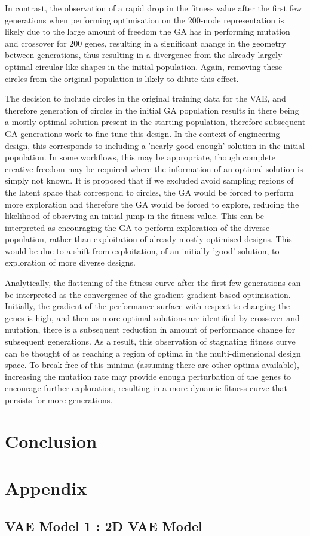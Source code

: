 \documentclass{article}
\begin{document}
In contrast, the observation of a rapid drop in the fitness value after the first few generations when performing optimisation on the 200-node representation is likely due to the large amount of freedom the GA has in performing mutation and crossover for 200 genes, resulting in a significant change in the geometry between generations, thus resulting in a divergence from the already largely optimal circular-like shapes in the initial population. Again, removing these circles from the original population is likely to dilute this effect.

The decision to include circles in the original training data for the VAE, and therefore generation of circles in the initial GA population results in there being a mostly optimal solution present in the starting population, therefore subsequent GA generations work to fine-tune this design. In the context of engineering design, this corresponds to including a 'nearly good enough' solution in the initial population. In some workflows, this may be appropriate, though complete creative freedom may be required where the information of an optimal solution is simply not known. It is proposed that if we excluded avoid sampling regions of the latent space that correspond to circles, the GA would be forced to perform more exploration and therefore the GA would be forced to explore, reducing the likelihood of observing an initial jump in the fitness value. This can be interpreted as encouraging the GA to perform exploration of the diverse population, rather than exploitation of already mostly optimised designs. This would be due to a shift from exploitation, of an initially 'good' solution, to exploration of more diverse designs.

Analytically, the flattening of the fitness curve after the first few generations can be interpreted as the convergence of the gradient gradient based optimisation. Initially, the gradient of the performance surface with respect to changing the genes is high, and then as more optimal solutions are identified by crossover and mutation, there is a subsequent reduction in amount of performance change for subsequent generations. As a result, this observation of stagnating fitness curve can be thought of as reaching a region of optima in the multi-dimensional design space. To break free of this minima (assuming there are other optima available), increasing  the mutation rate may provide enough perturbation of the genes to encourage further exploration, resulting in a more dynamic fitness curve that persists for more generations. 



\newpage{}
\section{Conclusion}

\newpage{}
\section{Appendix}
\subsection{VAE Model 1 : 2D VAE Model}








\newpage{}


\end{document}
